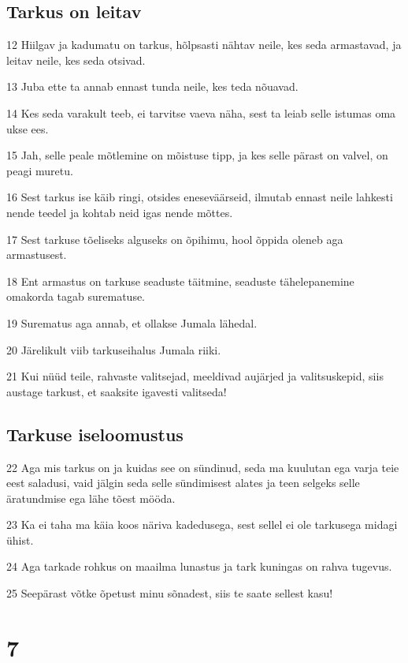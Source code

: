 \section*{Tarkus on leitav}

\par 12 Hiilgav ja kadumatu on tarkus, hõlpsasti nähtav neile, kes seda armastavad, ja leitav neile, kes seda otsivad.
\par 13 Juba ette ta annab ennast tunda neile, kes teda nõuavad.
\par 14 Kes seda varakult teeb, ei tarvitse vaeva näha, sest ta leiab selle istumas oma ukse ees.
\par 15 Jah, selle peale mõtlemine on mõistuse tipp, ja kes selle pärast on valvel, on peagi muretu.
\par 16 Sest tarkus ise käib ringi, otsides eneseväärseid, ilmutab ennast neile lahkesti nende teedel ja kohtab neid igas nende mõttes.
\par 17 Sest tarkuse tõeliseks alguseks on õpihimu, hool õppida oleneb aga armastusest.
\par 18 Ent armastus on tarkuse seaduste täitmine, seaduste tähelepanemine omakorda tagab surematuse.
\par 19 Surematus aga annab, et ollakse Jumala lähedal.
\par 20 Järelikult viib tarkuseihalus Jumala riiki.
\par 21 Kui nüüd teile, rahvaste valitsejad, meeldivad aujärjed ja valitsuskepid, siis austage tarkust, et saaksite igavesti valitseda! 

\section*{Tarkuse iseloomustus}

\par 22 Aga mis tarkus on ja kuidas see on sündinud, seda ma kuulutan ega varja teie eest saladusi, vaid jälgin seda selle sündimisest alates ja teen selgeks selle äratundmise ega lähe tõest mööda.
\par 23 Ka ei taha ma käia koos näriva kadedusega, sest sellel ei ole tarkusega midagi ühist.
\par 24 Aga tarkade rohkus on maailma lunastus ja tark kuningas on rahva tugevus.
\par 25 Seepärast võtke õpetust minu sõnadest, siis te saate sellest kasu! 

\chapter{7}

